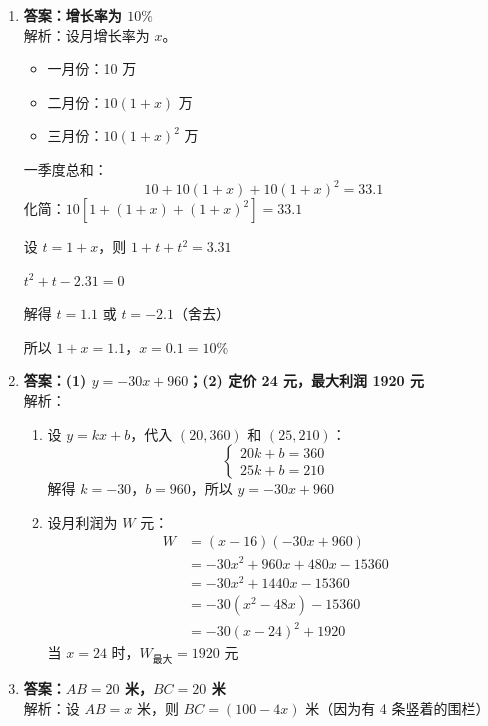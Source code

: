 \documentclass[12pt, a4paper]{article}
\begin{document}
\begin{answerbox}
    \begin{enumerate}
        \item \textbf{答案：增长率为 $10\%$} \\
        解析：设月增长率为 $x$。
        \begin{itemize}
            \item 一月份：10 万
            \item 二月份：$10(1+x)$ 万
            \item 三月份：$10(1+x)^2$ 万
        \end{itemize}
        一季度总和：
        \[10 + 10(1+x) + 10(1+x)^2 = 33.1\]
        化简：$10[1 + (1+x) + (1+x)^2] = 33.1$
        
        设 $t = 1+x$，则 $1 + t + t^2 = 3.31$
        
        $t^2 + t - 2.31 = 0$
        
        解得 $t = 1.1$ 或 $t = -2.1$（舍去）
        
        所以 $1+x = 1.1$，$x = 0.1 = 10\%$
        
        \item \textbf{答案：(1) $y = -30x + 960$；(2) 定价 24 元，最大利润 1920 元} \\
        解析：
        \begin{enumerate}
            \item[(1)] 设 $y = kx + b$，代入 $(20, 360)$ 和 $(25, 210)$：
            \[\begin{cases} 20k + b = 360 \\ 25k + b = 210 \end{cases}\]
            解得 $k = -30$，$b = 960$，所以 $y = -30x + 960$
            
            \item[(2)] 设月利润为 $W$ 元：
            \begin{align*}
                W &= (x - 16)(-30x + 960) \\
                &= -30x^2 + 960x + 480x - 15360 \\
                &= -30x^2 + 1440x - 15360 \\
                &= -30(x^2 - 48x) - 15360 \\
                &= -30(x - 24)^2 + 1920
            \end{align*}
            当 $x = 24$ 时，$W_{\text{最大}} = 1920$ 元
        \end{enumerate}
        
        \item \textbf{答案：$AB = 20$ 米，$BC = 20$ 米} \\
        解析：设 $AB = x$ 米，则 $BC = (100 - 4x)$ 米（因为有 4 条竖着的围栏）
        

\end{enumerate}
\end{answerbox}
\end{document}
